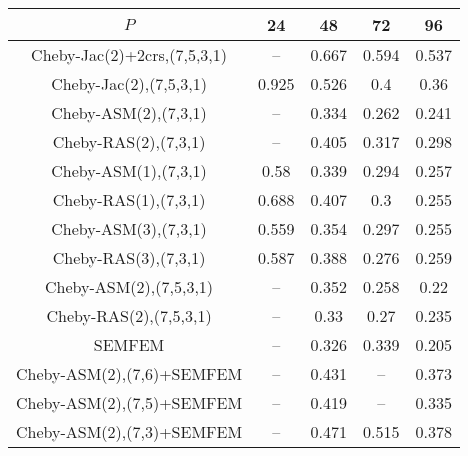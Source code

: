 \begin{table*}
\centering
\begin{tabular}{||c||cccc||}
	\hline
	$P$ & 24 & 48 & 72 & 96 \\
	\hline\hline
	Cheby-Jac(2)+2crs,(7,5,3,1)	&	 --	&	0.667	&	0.594	&	0.537\\
	Cheby-Jac(2),(7,5,3,1)	&	0.925	&	0.526	&	0.4	&	0.36\\
	Cheby-ASM(2),(7,3,1)	&	 --	&	0.334	&	0.262	&	0.241\\
	Cheby-RAS(2),(7,3,1)	&	 --	&	0.405	&	0.317	&	0.298\\
	Cheby-ASM(1),(7,3,1)	&	0.58	&	0.339	&	0.294	&	0.257\\
	Cheby-RAS(1),(7,3,1)	&	0.688	&	0.407	&	0.3	&	0.255\\
	Cheby-ASM(3),(7,3,1)	&	0.559	&	0.354	&	0.297	&	0.255\\
	Cheby-RAS(3),(7,3,1)	&	0.587	&	0.388	&	0.276	&	0.259\\
	Cheby-ASM(2),(7,5,3,1)	&	 --	&	0.352	&	0.258	&	0.22\\
	Cheby-RAS(2),(7,5,3,1)	&	 --	&	0.33	&	0.27	&	0.235\\
	SEMFEM	&	 --	&	0.326	&	0.339	&	0.205\\
	Cheby-ASM(2),(7,6)+SEMFEM	&	 --	&	0.431	&	 --	&	0.373\\
	Cheby-ASM(2),(7,5)+SEMFEM	&	 --	&	0.419	&	 --	&	0.335\\
	Cheby-ASM(2),(7,3)+SEMFEM	&	 --	&	0.471	&	0.515	&	0.378\\
\hline
\end{tabular}
\caption{\label{table:foobar}}
\end{table*}
